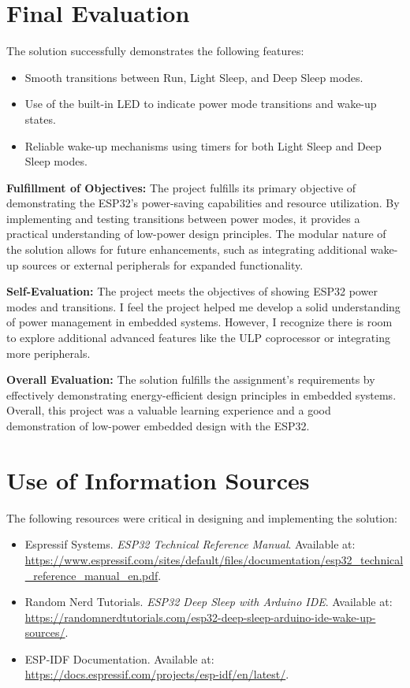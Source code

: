 \documentclass[a4paper, 11pt]{article}
\begin{document}
    \newpage
    \section*{Final Evaluation}
    The solution successfully demonstrates the following features:
    \begin{itemize}
    \item Smooth transitions between Run, Light Sleep, and Deep Sleep modes.
    \item Use of the built-in LED to indicate power mode transitions and wake-up states.
    \item Reliable wake-up mechanisms using timers for both Light Sleep and Deep Sleep modes.
    \end{itemize}
    
    \textbf{Fulfillment of Objectives:}  
    The project fulfills its primary objective of demonstrating the ESP32's power-saving capabilities and resource utilization. By implementing and testing transitions between power modes, it provides a practical understanding of low-power design principles. The modular nature of the solution allows for future enhancements, such as integrating additional wake-up sources or external peripherals for expanded functionality.
    
    \textbf{Self-Evaluation:}
    The project meets the objectives of showing ESP32 power modes and transitions. I feel the project helped me develop a solid understanding of power management in embedded systems. However, I recognize there is room to explore additional advanced features like the ULP coprocessor or integrating more peripherals.
    
    \textbf{Overall Evaluation:}
    The solution fulfills the assignment's requirements by effectively demonstrating energy-efficient design principles in embedded systems. Overall, this project was a valuable learning experience and a good demonstration of low-power embedded design with the ESP32.
    
    \section*{Use of Information Sources}
    The following resources were critical in designing and implementing the solution:
    \begin{itemize}
        \item Espressif Systems. \textit{ESP32 Technical Reference Manual}. Available at: \url{https://www.espressif.com/sites/default/files/documentation/esp32_technical_reference_manual_en.pdf}.
        \item Random Nerd Tutorials. \textit{ESP32 Deep Sleep with Arduino IDE}. Available at: \url{https://randomnerdtutorials.com/esp32-deep-sleep-arduino-ide-wake-up-sources/}.
        \item ESP-IDF Documentation. Available at: \url{https://docs.espressif.com/projects/esp-idf/en/latest/}.
    \end{itemize}
\end{document}
